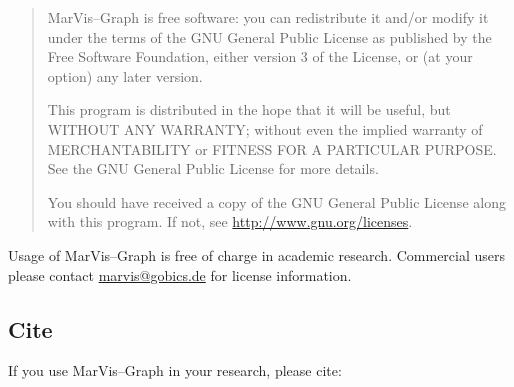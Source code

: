 \documentclass[titlepage,a4paper,twoside,9pt]{article}
\newcommand{\mg}{Mar\-Vis--Graph\xspace}
\begin{document}
\begin{quote}\mg is free software: you can redistribute it and/or modify
    it under the terms of the GNU General Public License as published by
    the Free Software Foundation, either version 3 of the License, or
    (at your option) any later version.

    This program is distributed in the hope that it will be useful,
    but WITHOUT ANY WARRANTY; without even the implied warranty of
    MERCHANTABILITY or FITNESS FOR A PARTICULAR PURPOSE.  See the
    GNU General Public License for more details.

    You should have received a copy of the GNU General Public License
	along with this program.  If not, see \url{http://www.gnu.org/licenses}.
\end{quote}

Usage of \mg is free of charge in academic research. Commercial users please
contact \href{mailto:marvis@gobics.de}{marvis@gobics.de} for license
information.

\subsection{Cite}

If you use \mg in your research, please cite:
\cite{landesfeind2014marvisgraph}




\end{document}
